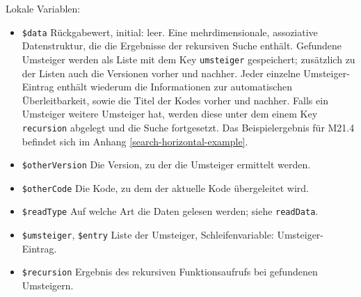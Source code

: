 Lokale Variablen:

\begin{itemize}
\item \texttt{\$data} \hspace{2em} Rückgabewert, initial: leer.
\newline Eine mehrdimensionale, assoziative Datenstruktur, die die Ergebnisse der rekursiven Suche enthält. Gefundene Umsteiger werden als Liste mit dem Key \texttt{umsteiger} gespeichert; zusätzlich zu der Listen auch die Versionen vorher und nachher. Jeder einzelne Umsteiger-Eintrag enthält wiederum die Informationen zur automatischen Überleitbarkeit, sowie die Titel der Kodes vorher und nachher. Falls ein Umsteiger weitere Umsteiger hat, werden diese unter dem einem Key \texttt{recursion} abgelegt und die Suche fortgesetzt. Das Beispielergebnis für M21.4 befindet sich im Anhang \ref{search-horizontal-example}.
\item \texttt{\$otherVersion} \newline Die Version, zu der die Umsteiger ermittelt werden.
\item \texttt{\$otherCode} \newline Die Kode, zu dem der aktuelle Kode übergeleitet wird.
\item \texttt{\$readType} \newline Auf welche Art die Daten gelesen werden; siehe \texttt{readData}.
\item \texttt{\$umsteiger}, \texttt{\$entry} \newline Liste der Umsteiger, Schleifenvariable: Umsteiger-Eintrag.
\item \texttt{\$recursion} \newline Ergebnis des rekursiven Funktionsaufrufs bei gefundenen Umsteigern. \\
\end{itemize}



